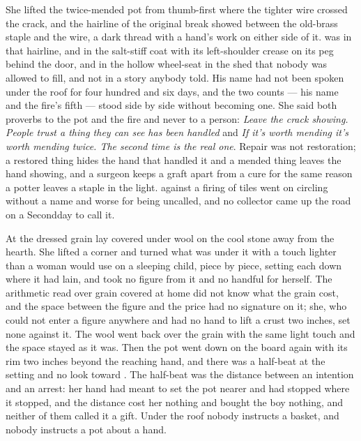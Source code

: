 She lifted the twice-mended pot from  thumb-first where the tighter wire crossed the crack, and the hairline of the original break showed between the old-brass staple and the wire, a dark thread with a hand's work on either side of it.  was in that hairline, and in the salt-stiff coat with its left-shoulder crease on its peg behind the door, and in the hollow wheel-seat in the shed that nobody was allowed to fill, and not in a story anybody told. His name had not been spoken under the roof for four hundred and six days, and the two counts --- his name and the fire's fifth --- stood side by side without becoming one. She said both proverbs to the pot and the fire and never to a person: \emph{Leave the crack showing. People trust a thing they can see has been handled} and \emph{If it's worth mending it's worth mending twice. The second time is the real one}. Repair was not restoration; a restored thing hides the hand that handled it and a mended thing leaves the hand showing, and a surgeon keeps a graft apart from a cure for the same reason a potter leaves a staple in the light.  against a firing of tiles went on circling without a name and worse for being uncalled, and no collector came up the road on a Secondday to call it.

At  the dressed grain lay covered under wool on the cool stone away from the hearth. She lifted a corner and turned what was under it with a touch lighter than a woman would use on a sleeping child, piece by piece, setting each down where it had lain, and took no figure from it and no handful for herself. The arithmetic read over grain covered at home did not know what the grain cost, and the space between the figure and the price had no signature on it; she, who could not enter a figure anywhere and had no hand to lift a crust two inches, set none against it. The wool went back over the grain with the same light touch and the space stayed as it was. Then the pot went down on the board again with its rim two inches beyond the reaching hand, and there was a half-beat at the setting and no look toward . The half-beat was the distance between an intention and an arrest: her hand had meant to set the pot nearer and had stopped where it stopped, and the distance cost her nothing and bought the boy nothing, and neither of them called it a gift. Under the roof nobody instructs a basket, and nobody instructs a pot about a hand.

